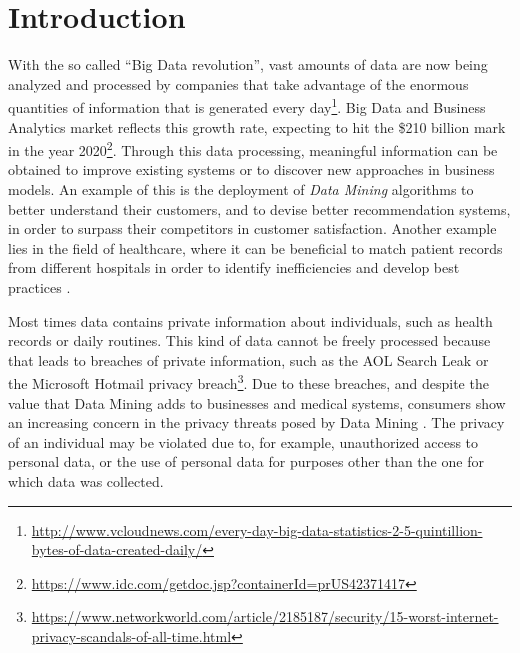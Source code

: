 %

\acresetall

\chapter{Introduction}
\label{ch:Introduction}



With the so called ``Big Data revolution'', vast amounts of data are now being analyzed and processed by companies that take advantage of the enormous quantities of information that is generated every day\footnote{\url{http://www.vcloudnews.com/every-day-big-data-statistics-2-5-quintillion-bytes-of-data-created-daily/}}. Big Data and Business Analytics market reflects this growth rate, expecting to hit the \$210 billion mark in the year 2020\footnote{\url{https://www.idc.com/getdoc.jsp?containerId=prUS42371417}}.
Through this data processing, meaningful information can be obtained to improve existing systems or to discover new approaches in business models. An example of this is the deployment of \textit{Data Mining} algorithms to better understand their customers, and to devise better recommendation systems, in order to surpass their competitors in customer satisfaction. Another example lies in the field of healthcare, where it can be beneficial to match patient records from different hospitals in order to identify inefficiencies and develop best practices \cite{Lu2014}. 

Most times data contains private information about individuals, such as health records or daily routines. This kind of data cannot be freely processed because that leads to breaches of private information, such as the AOL Search Leak or the Microsoft Hotmail privacy breach\footnote{\url{https://www.networkworld.com/article/2185187/security/15-worst-internet-privacy-scandals-of-all-time.html}}. Due to these breaches, and despite the value that Data Mining adds to businesses and medical systems, consumers show an increasing concern in the privacy threats posed by Data Mining \cite{brankovic1999privacy}. The privacy of an individual may be violated due to, for example, unauthorized access to personal data, or the use of personal data for purposes other than the one for which data was collected.

